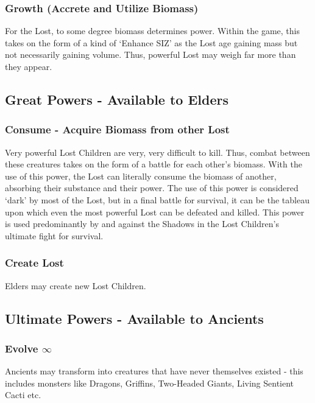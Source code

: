\documentclass[letterpaper,serif]{rpg-module}
\begin{document}
\subsubsection{Growth (Accrete and Utilize Biomass)}

For the Lost, to some degree biomass determines power. Within the game, this takes on the form of a kind of `Enhance SIZ' as the Lost age gaining mass but not necessarily gaining volume. Thus, powerful Lost may weigh far more than they appear.

\subsection{Great Powers - Available to Elders }

\subsubsection{Consume - Acquire Biomass from other Lost}

Very powerful Lost Children are very, very difficult to kill. Thus, combat between these creatures takes on the form of a battle for each other's biomass. With the use of this power, the Lost can literally consume the biomass of another, absorbing their substance and their power. The use of this power is considered `dark' by most of the Lost, but in a final battle for survival, it can be the tableau upon which even the most powerful Lost can be defeated and killed. This power is used predominantly by and against the Shadows in the Lost Children's ultimate fight for survival.  

\subsubsection{Create Lost}

Elders may create new Lost Children.

\subsection{Ultimate Powers - Available to Ancients }

\subsubsection{Evolve $\infty$}

Ancients may transform into creatures that have never themselves existed - this includes monsters like Dragons, Griffins, Two-Headed Giants, Living Sentient Cacti etc.
\end{document}
